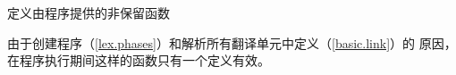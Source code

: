 定义由\cpp{}程序提供的非保留函数

\begin{note}[\noindent]
  由于创建程序（\ref{lex.phases}）和解析所有翻译单元中定义（\ref{basic.link}）的
  原因，在程序执行期间这样的函数只有一个定义有效。
\end{note}
